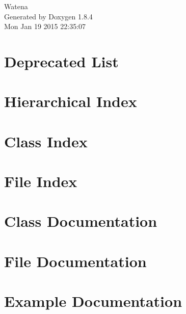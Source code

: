\documentclass[twoside]{book}
\newcommand{\clearemptydoublepage}{%
  \newpage{\pagestyle{empty}\cleardoublepage}%
}
\begin{document}
\hypersetup{pageanchor=false}
\begin{titlepage}
\vspace*{7cm}
\begin{center}%
{\Large Watena }\\
\vspace*{1cm}
{\large Generated by Doxygen 1.8.4}\\
\vspace*{0.5cm}
{\small Mon Jan 19 2015 22:35:07}\\
\end{center}
\end{titlepage}
\clearemptydoublepage
\tableofcontents
\clearemptydoublepage
{}
\hypersetup{pageanchor=true}

\chapter{Deprecated List}
\label{deprecated}
\hypertarget{deprecated}{}

\chapter{Hierarchical Index}

\chapter{Class Index}

\chapter{File Index}

\chapter{Class Documentation}




































\chapter{File Documentation}

\chapter{Example Documentation}


\newpage
{}
{}
\printindex
\end{document}
